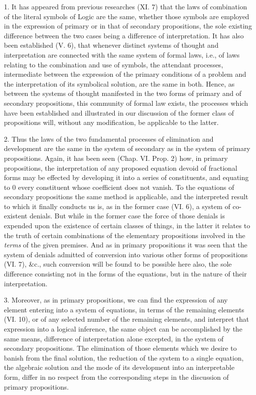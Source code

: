 \documentclass[oneside]{book}
\begin{document}
1. It has appeared from previous researches (XI. 7) that the
laws of combination of the literal symbols of Logic are the
same, whether those symbols are employed in the expression of
primary or in that of secondary propositions, the sole existing
difference between the two cases being a difference of interpretation.
It has also been established (V. 6), that whenever distinct
systems of thought and interpretation are connected with
the same system of formal laws, i.e., of laws relating to the combination
and use of symbols, the attendant processes, intermediate
between the expression of the primary conditions of a problem
and the interpretation of its symbolical solution, are the same in
both. Hence, as between the systems of thought manifested in
the two forms of primary and of secondary propositions, this community
of formal law exists, the processes which have been established
and illustrated in our discussion of the former class of
propositions will, without any modification, be applicable to the
latter.

2. Thus the laws of the two fundamental processes of elimination
and development are the same in the system of secondary
as in the system of primary propositions. Again, it has been
seen (Chap. VI. Prop. 2) how, in primary propositions, the interpretation
of any proposed equation devoid of fractional forms
may be effected by developing it into a series of constituents, and
equating to 0 every constituent whose coefficient does not vanish.
To the equations of secondary propositions the same method is
applicable, and the interpreted result to which it finally conducts
us is, as in the former case (VI. 6), a system of co-existent denials.
But while in the former case the force of those denials is expended
upon the existence of certain classes of things, in the
latter it relates to the truth of certain combinations of the elementary
propositions involved in the \textit{terms} of the given premises.
And as in primary propositions it was seen that the system of
denials admitted of conversion into various other forms of propositions
(VI. 7), \&c., such conversion will be found to be possible
here also, the sole difference consisting not in the forms of the
equations, but in the nature of their interpretation.

3. Moreover, as in primary propositions, we can find the expression
of any element entering into a system of equations, in
terms of the remaining elements (VI. 10), or of any selected
number of the remaining elements, and interpret that expression
into a logical inference, the same object can be accomplished by
the same means, difference of interpretation alone excepted, in
the system of secondary propositions. The elimination of those
elements which we desire to banish from the final solution, the
reduction of the system to a single equation, the algebraic solution
and the mode of its development into an interpretable form,
differ in no respect from the corresponding steps in the discussion
of primary propositions.
\end{document}
